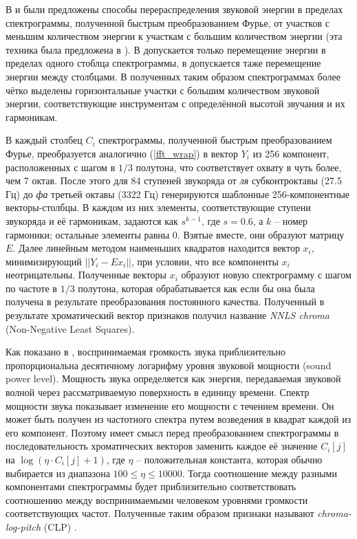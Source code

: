 В \cite{Weller2009} и \cite{Khadkevich2011} были предложены способы
перераспределения звуковой энергии в пределах спектрограммы, полученной быстрым
преобразованием Фурье, от участков с меньшим количеством энергии к участкам с
большим количеством энергии (эта техника была предложена в \cite{Kodera1978}). В
\cite{Weller2009} допускается только перемещение энергии в пределах одного
стоблца спектрограммы, в \cite{Khadkevich2011} допускается таже перемещение
энергии между столбцами. В полученных таким образом спектрограммах более чётко
выделены горизонтальные участки с большим количеством звуковой энергии,
соответствующие инструментам с определённой высотой звучания и их гармоникам.

В \cite{Mauch2010} каждый столбец $C_i$ спектрограммы, полученной быстрым
преобразованием Фурье, преобразуется аналогично (\ref{fft_wrap}) в вектор $Y_i$
из 256 компонент, расположенных с шагом в $1/3$ полутона, что соответствует
охвату в чуть более, чем 7 октав. После этого для 84 ступеней звукоряда от
\emph{ля} субконтроктавы (27.5 Гц) до \emph{фа} третьей октавы (3322 Гц)
генерируются шаблонные 256-компонентные векторы-столбцы. В каждом из них
элементы, соответствующие ступени звукоряда и её гармоникам, задаются как
$s^{k-1}$, где $s=0.6$, а $k$ -- номер гармоники; остальные элементы равны 0.
Взятые вместе, они образуют матрицу $E$. Далее линейным методом наименьших
квадратов находится вектор $x_i$, минимизирующий $||Y_i - Ex_i||$, при условии,
что все компоненты $x_i$ неотрицательны. Полученные векторы $x_i$ образуют новую
спектрограмму с шагом по частоте в $1/3$ полутона, которая обрабатывается как
если бы она была получена в результате преобразования постоянного качества.
Полученный в результате хроматический вектор признаков получил название
\emph{NNLS chroma} (Non-Negative Least Squares).

Как показано в \cite{Fletcher1933}, воспринимаемая громкость звука
приблизительно пропорциональна десятичному логарифму уровня звуковой мощности
(sound power level). Мощность звука определяется как энергия, передаваемая
звуковой волной через рассматриваемую поверхность в единицу времени. Спектр
мощности звука показывает изменение его мощности с течением времени. Он может
быть получен из частотного спектра путем возведения в квадрат каждой из его
компонент. Поэтому имеет смысл перед преобразованием спектрограммы в
последовательность хроматических векторов заменить каждое её значение $C_i[j]$
на $\log (\eta \cdot C_i[j] + 1)$, где $\eta$ -- положительная константа,
которая обычно выбирается из диапазона $100 \leq \eta \leq 10000$. Тогда
соотношение между разными компонентами спектрограммы будет приблизительно
соответствовать соотношению между воспринимаемыми человеком уровнями громкости
соответствующих частот. Полученные таким образом признаки называют
\emph{chroma-log-pitch} (CLP) \cite{Jiang2011}.


